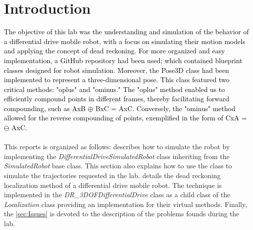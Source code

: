 \documentclass[letterpaper,12pt]{article}
\begin{document}
\section{Introduction}
\textcolor{black}{The objective of this lab was the understanding and simulation of the behavior of a differential drive mobile robot, with a focus on simulating their motion models and applying the concept of dead reckoning. For more organized and easy implementation,  a GitHub repository had been used; which contained blueprint classes designed for robot simulation. Moreover, the Pose3D class had been implemented to represent a three-dimensional pose. This class featured two critical methods: "oplus" and "ominus." The "oplus" method enabled us to efficiently compound points in different frames, thereby facilitating forward compounding, such as AxB $\oplus$  BxC = AxC. Conversely, the "ominus" method allowed for the reverse compounding of points, exemplified in the form of CxA =  $ \ominus $ AxC}.\\
\\This reports is organized as follows:  describes how to simulate the robot by implementing the \emph{DifferentialDriveSimulatedRobot} class inheriting from the \emph{SimulatedRobot} base class. This section also explains how to use the class to simulate the trajectories requested in the lab.  details the dead reckoning localization method of a differential drive mobile robot. The technique is implemented in the \emph{DR\_3DOFDifferentialDrive} class as a child class of the \emph{Localization} class providing an implementation for their virtual methods. Finally, the \cref{sec:Issues} is devoted to the description of the problems founds during the lab.
\end{document}
